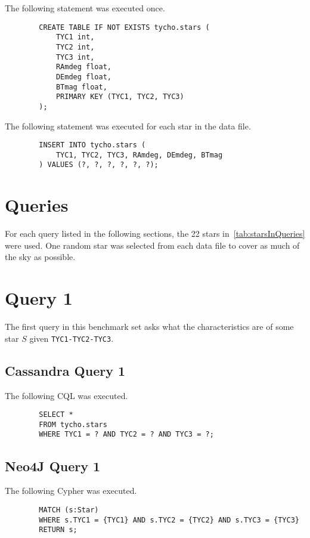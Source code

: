 \documentclass[11pt]{article}
\begin{document}
    The following statement was executed once.
    \begin{lstlisting}
        CREATE TABLE IF NOT EXISTS tycho.stars (
            TYC1 int,
            TYC2 int,
            TYC3 int,
            RAmdeg float,
            DEmdeg float,
            BTmag float,
            PRIMARY KEY (TYC1, TYC2, TYC3)
        );
    \end{lstlisting}

    The following statement was executed for each star in the data file.
    \begin{lstlisting}
        INSERT INTO tycho.stars (
            TYC1, TYC2, TYC3, RAmdeg, DEmdeg, BTmag
        ) VALUES (?, ?, ?, ?, ?, ?);
    \end{lstlisting}

    \section{Queries}\label{sec:queries}
    For each query listed in the following sections, the 22 stars in~\autoref{tab:starsInQueries} were used.
    One random star was selected from each data file to cover as much of the sky as possible.

    \section{Query 1}\label{sec:query1}
    The first query in this benchmark set asks what the characteristics are of some star $S$ given
    \texttt{TYC1-TYC2-TYC3}.

    \subsection{Cassandra Query 1}\label{subsec:cassandraQuery1}
    The following CQL was executed.
    \begin{lstlisting}
        SELECT *
        FROM tycho.stars
        WHERE TYC1 = ? AND TYC2 = ? AND TYC3 = ?;
    \end{lstlisting}

    \subsection{Neo4J Query 1}\label{subsec:neo4jQuery1}
    The following Cypher was executed.
    \begin{lstlisting}
        MATCH (s:Star)
        WHERE s.TYC1 = {TYC1} AND s.TYC2 = {TYC2} AND s.TYC3 = {TYC3}
        RETURN s;
    \end{lstlisting}
\end{document}
